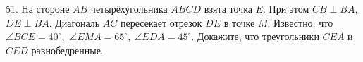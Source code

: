 51. На стороне $AB$ четырёхугольника $ABCD$ взята точка $E.$ При этом $CB\perp BA,$ $DE\perp BA.$ Диагональ $AC$ пересекает отрезок $DE$ в точке $M.$ Известно, что
$\angle BCE=40^\circ,$ $\angle EMA=65^\circ,\ \angle EDA=45^\circ.$ Докажите, что треугольники $CEA$ и $CED$ равнобедренные.\\
